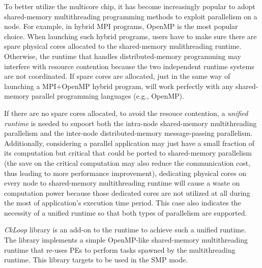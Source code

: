 To better utilize the multicore chip, it has become increasingly popular to
adopt shared-memory multithreading programming methods to exploit parallelism
on a node. For example, in hybrid MPI programs, OpenMP is the most popular
choice.  When launching such hybrid programs, users have to make sure there are
spare physical cores allocated to the shared-memory mulithreading runtime.
Otherwise, the runtime that handles distributed-memory programming may
interfere with resource contention because the two independent runtime systems
are not coordinated.  If spare cores are allocated, just in the same way of
launching a MPI+OpenMP hybrid program, \charmpp{} will work perfectly with any
shared-memory parallel programming languages (e.g., OpenMP).

If there are no spare cores allocated, to avoid the resouce contention, a
\emph{unified runtime} is needed to supoort both the intra-node shared-memory
multithreading parallelism and the inter-node distributed-memory
message-passing parallelism. Additionally, considering a parallel application
may just have a small fraction of its computation but critical that could be
ported to shared-memory parallelism (the save on the critical computation may
also reduce the communication cost, thus leading to more performance
improvement), dedicating physical cores on every node to shared-memory
multithreading runtime will cause a waste on computation power because those
dedicated cores are not utilized at all during the most of application's
execution time period. This case also indicates the necessity of a unified
runtime so that both types of parallelism are supported.

\emph{CkLoop} library is an add-on to the \charmpp{} runtime to achieve such a
unified runtime.  The library implements a simple OpenMP-like shared-memory
multithreading runtime that re-uses \charmpp{} PEs to perform tasks spawned by
the multithreading runtime. This library targets to be used in the \charmpp{}
SMP mode.

